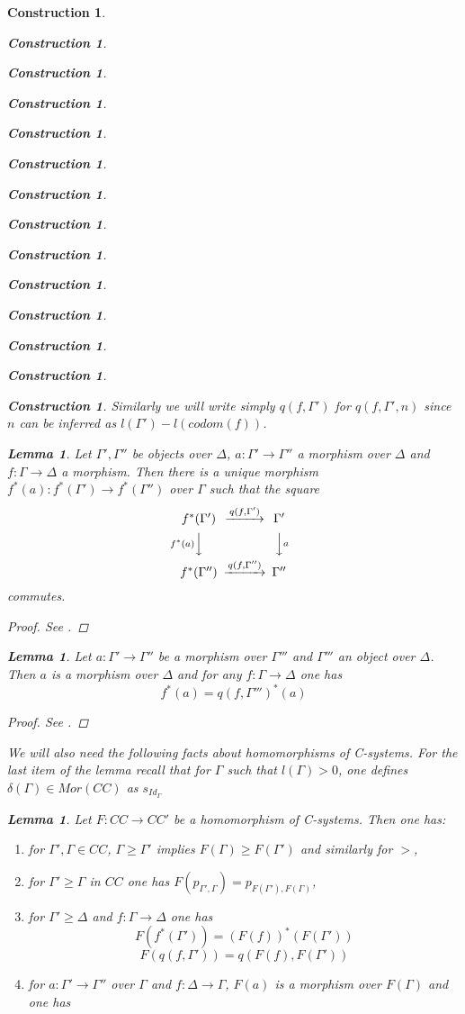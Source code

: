 \documentclass[12pt]{amsart}
\newenvironment{eq}{\begin{equation}}{\end{equation}}
\newtheorem{lemma}[proposition]{Lemma}
\newtheorem{construction}[proposition]{Construction}
\newcommand{\llabel}[1]{\label{#1}}
\newcommand{\sr}{\rightarrow}
\begin{document}
\begin{construction}
\begin{construction}
\begin{construction}
\begin{construction}
\begin{construction}
\begin{construction}
\begin{construction}
\begin{construction}
\begin{construction}
\begin{construction}
\begin{construction}
\begin{construction}
\begin{construction}
\begin{construction}
Similarly we will write simply $q(f,\Gamma')$ for $q(f,\Gamma',n)$ since $n$ can be inferred as $l(\Gamma')-l(codom(f))$. 
%
\begin{lemma}
\llabel{2015.08.23.l1a} 
Let $\Gamma',\Gamma''$ be objects over $\Delta$,
$a:\Gamma'\sr \Gamma''$ a morphism over $\Delta$ and $f:\Gamma\sr\Delta$ a
morphism. Then there is a unique morphism $f^*(a):f^*(\Gamma')\sr
f^*(\Gamma'')$ over $\Gamma$ such that the square
%
$$
\begin{CD}
f^*(\Gamma') @>q(f,\Gamma')>> \Gamma'\\
@Vf^*(a)VV @VVaV\\
f^*(\Gamma'') @>q(f,\Gamma'')>> \Gamma''
\end{CD}
$$
%
commutes.
\end{lemma}
%
\begin{proof}
See \cite[Lemma 2.13]{fromunivwithPiI}.
\end{proof}
%
\begin{lemma}
\llabel{2015.08.29.l2} 
Let $a:\Gamma'\sr\Gamma''$ be a morphism over
$\Gamma'''$ and $\Gamma'''$ an object over $\Delta$. Then $a$ is a morphism
over $\Delta$ and for any $f:\Gamma\sr \Delta$ one has
%
\begin{eq}\llabel{2015.08.29.eq2}
f^*(a)=q(f,\Gamma''')^*(a)
\end{eq}%
%
\end{lemma}
%
\begin{proof}
See \cite[Lemma 2.15]{fromunivwithPiI}.
\end{proof}
%
We will also need the following facts about homomorphisms of C-systems. For the
last item of the lemma recall that for $\Gamma$ such that $l(\Gamma)>0$, one
defines $\delta(\Gamma)\in Mor(CC)$ as $s_{Id_{\Gamma}}$
%
\begin{lemma}
\llabel{2015.09.03.l2}
Let $F:CC\sr CC'$ be a homomorphism of C-systems. Then one has:
%
\begin{enumerate}
\item for $\Gamma',\Gamma\in CC$, $\Gamma\ge \Gamma'$ implies $F(\Gamma)\ge F(\Gamma')$ and similarly for $>$,
\item for $\Gamma'\ge \Gamma$ in $CC$ one has $F(p_{\Gamma',\Gamma})=p_{F(\Gamma'),F(\Gamma)}$,
\item for $\Gamma'\ge \Delta$ and $f:\Gamma\sr \Delta$ one has
%
$$F(f^*(\Gamma'))=(F(f))^*(F(\Gamma'))$$
$$F(q(f,\Gamma'))=q(F(f),F(\Gamma'))$$
%
\item for $a:\Gamma'\sr \Gamma''$ over $\Gamma$ and $f:\Delta\sr \Gamma$, $F(a)$ is a morphism over $F(\Gamma)$ and one has

\end{enumerate}
\end{lemma}
\end{construction}
\end{construction}
\end{construction}
\end{construction}
\end{construction}
\end{construction}
\end{construction}
\end{construction}
\end{construction}
\end{construction}
\end{construction}
\end{construction}
\end{construction}
\end{construction}
\end{document}
